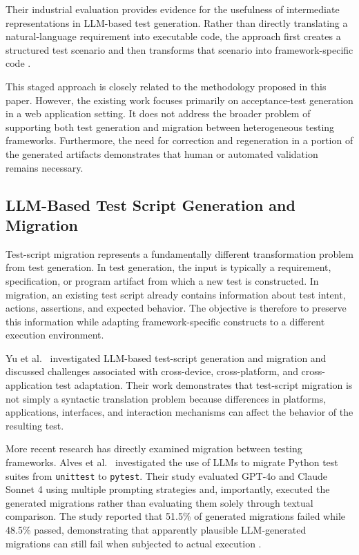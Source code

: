 \documentclass[pdflatex,sn-mathphys-num]{sn-jnl}
\begin{document}
Their industrial evaluation provides evidence for the usefulness of
intermediate representations in LLM-based test generation. Rather than
directly translating a natural-language requirement into executable code,
the approach first creates a structured test scenario and then transforms
that scenario into framework-specific code
\cite{ferreira2025acceptance}.

This staged approach is closely related to the methodology proposed in this
paper. However, the existing work focuses primarily on acceptance-test
generation in a web application setting. It does not address the broader
problem of supporting both test generation and migration between
heterogeneous testing frameworks. Furthermore, the need for correction and
regeneration in a portion of the generated artifacts demonstrates that
human or automated validation remains necessary.

\subsection{LLM-Based Test Script Generation and Migration}
\label{subsec:test-migration}

Test-script migration represents a fundamentally different transformation
problem from test generation. In test generation, the input is typically
a requirement, specification, or program artifact from which a new test is
constructed. In migration, an existing test script already contains
information about test intent, actions, assertions, and expected behavior.
The objective is therefore to preserve this information while adapting
framework-specific constructs to a different execution environment.

Yu et al.~\cite{yu2023testscript} investigated LLM-based test-script
generation and migration and discussed challenges associated with
cross-device, cross-platform, and cross-application test adaptation.
Their work demonstrates that test-script migration is not simply a
syntactic translation problem because differences in platforms,
applications, interfaces, and interaction mechanisms can affect the
behavior of the resulting test.

More recent research has directly examined migration between testing
frameworks. Alves et al.~\cite{alves2026migration} investigated the use
of LLMs to migrate Python test suites from \texttt{unittest} to
\texttt{pytest}. Their study evaluated GPT-4o and Claude Sonnet 4 using
multiple prompting strategies and, importantly, executed the generated
migrations rather than evaluating them solely through textual comparison.
The study reported that 51.5\% of generated migrations failed while
48.5\% passed, demonstrating that apparently plausible LLM-generated
migrations can still fail when subjected to actual execution
\cite{alves2026migration}.
\end{document}

